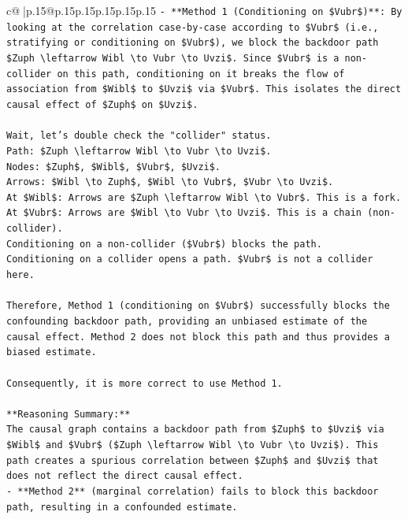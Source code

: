 \documentclass{article}
\begin{document}
{\begin{supertabular}{c@{$\;$}|p{.15\linewidth}@{}p{.15\linewidth}p{.15\linewidth}p{.15\linewidth}p{.15\linewidth}p{.15\linewidth}}
{{{\texttt{{-} **Method 1 (Conditioning on \$Vubr\$)**: By looking at the correlation case{-}by{-}case according to \$Vubr\$ (i.e., stratifying or conditioning on \$Vubr\$), we block the backdoor path \$Zuph \textbackslash{}leftarrow Wibl \textbackslash{}to Vubr \textbackslash{}to Uvzi\$. Since \$Vubr\$ is a non{-}collider on this path, conditioning on it breaks the flow of association from \$Wibl\$ to \$Uvzi\$ via \$Vubr\$. This isolates the direct causal effect of \$Zuph\$ on \$Uvzi\$.} \\
\\ 
\texttt{Wait, let's double check the "collider" status.} \\
\texttt{Path: \$Zuph \textbackslash{}leftarrow Wibl \textbackslash{}to Vubr \textbackslash{}to Uvzi\$.} \\
\texttt{Nodes: \$Zuph\$, \$Wibl\$, \$Vubr\$, \$Uvzi\$.} \\
\texttt{Arrows: \$Wibl \textbackslash{}to Zuph\$, \$Wibl \textbackslash{}to Vubr\$, \$Vubr \textbackslash{}to Uvzi\$.} \\
\texttt{At \$Wibl\$: Arrows are \$Zuph \textbackslash{}leftarrow Wibl \textbackslash{}to Vubr\$. This is a fork.} \\
\texttt{At \$Vubr\$: Arrows are \$Wibl \textbackslash{}to Vubr \textbackslash{}to Uvzi\$. This is a chain (non{-}collider).} \\
\texttt{Conditioning on a non{-}collider (\$Vubr\$) blocks the path.} \\
\texttt{Conditioning on a collider opens a path. \$Vubr\$ is not a collider here.} \\
\\ 
\texttt{Therefore, Method 1 (conditioning on \$Vubr\$) successfully blocks the confounding backdoor path, providing an unbiased estimate of the causal effect. Method 2 does not block this path and thus provides a biased estimate.} \\
\\ 
\texttt{Consequently, it is more correct to use Method 1.} \\
\\ 
\texttt{**Reasoning Summary:**} \\
\texttt{The causal graph contains a backdoor path from \$Zuph\$ to \$Uvzi\$ via \$Wibl\$ and \$Vubr\$ (\$Zuph \textbackslash{}leftarrow Wibl \textbackslash{}to Vubr \textbackslash{}to Uvzi\$). This path creates a spurious correlation between \$Zuph\$ and \$Uvzi\$ that does not reflect the direct causal effect.} \\
\texttt{{-} **Method 2** (marginal correlation) fails to block this backdoor path, resulting in a confounded estimate.} \\
}}}
\end{supertabular}}
\end{document}
